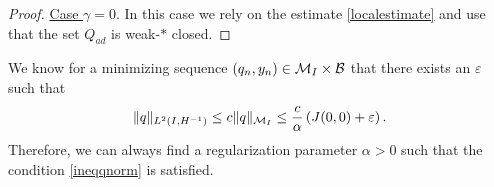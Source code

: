 \begin{proof}
\underline{Case $\gamma = 0$}. In this case we rely on the estimate \eqref{localestimate} and use that the set $Q_{ad}$ is weak-$*$ closed.
\end{proof}
\begin{rmk}
 We know for a minimizing sequence $(q_n, y_n)\in \mathcal{M}_I\times \mathcal B$ that there exists an $\varepsilon$ such that
 \[
\lVert q\rVert_{L^2(I,H^{-1})} \leq c\lVert q\rVert_{\mathcal{M}_I} \leq \frac{c}{\alpha}\left(J(0,0) + \varepsilon \right).
 \]
 Therefore, we can always find a regularization parameter $\alpha>0$ such that the condition \eqref{ineqqnorm} is satisfied.
\end{rmk}

